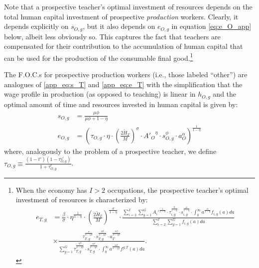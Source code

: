 \documentclass[onehalfspacing,11pt]{article}
\begin{document}
	Note that a prospective teacher's optimal investment of resources depends on the total human capital investment of prospective {\it production} workers. Clearly, it depends explicitly on $s_{O,g}$, but it also depends on $e_{O,g}$ in equation \eqref{eq:e_O_app} below, albeit less obviously so. This captures the fact that teachers are compensated for their contribution to the accumulation of human capital that can be used for the production of the consumable final good.\footnote{When the economy has $I>2$ occupations, the prospective teacher's optimal investment of resources is characterized by:
		\begin{align*}
			e_{T,g} & = \tfrac{\beta}{\sigma}\cdot\eta^{\frac{1}{1-\eta}}\cdot \left(\tfrac{2\widetilde{H}_T}{M}\right)^{\frac{\sigma}{1-\eta}} \cdot \frac{\sum_{i=2}^I \sum_{g=1}^G {A_i'}^\frac{1}{1-\eta}\cdot\tau_{i,g}^\frac{\eta}{1-\eta} \cdot s_{i,g}^\frac{\phi}{1-\eta}\cdot \int_0^\infty a^{\frac{\alpha}{1-\eta}} f_{i,g}(a)da}{\sum_{i=2}^I \sum_{g=1}^G f_{i,g}(a)da} \nonumber\\
			& \times \frac{\tau_{T,g}^\frac{\sigma}{\sigma-\eta\beta } \cdot s_{T,g}^\frac{\phi\beta }{\sigma-\eta\beta } \cdot a_T^\frac{\alpha\beta }{\sigma-\eta\beta }}{\sum_{g=1}^G \tau_{T,g}^\frac{\eta\beta }{\sigma-\eta\beta } \cdot s_{T,g}^\frac{\phi\beta }{\sigma-\eta\beta } \cdot \int_0^\infty a^\frac{\alpha\beta}{\sigma-\eta\beta } f^{g,T}(a)da}.
		\end{align*}
	}
	
	The F.O.C.s for prospective production workers (i.e., those labeled ``other'') are analogues of \eqref{app_eq:s_T} and \eqref{app_eq:e_T} with the simplification that the wage profile in production (as opposed to teaching) is linear in $h_{O,g}$ and the optimal amount of time and resources invested in human capital is given by:
	\begin{align}
		s_{O,g} & = \frac{\mu \phi}{\mu \phi+1-\eta} \\
		\label{eq:e_O_app}
		e_{O,g} & = \left( \tau_{O,g} \cdot \eta \cdot \left(\tfrac{2\widetilde{H}_T}{M}\right)^\sigma\cdot {A'_{O}}^\eta \cdot s_{O,g}^\phi \cdot a_O^\alpha \right)^{\frac{1}{1-\eta}}
	\end{align}
	where, analogously to the problem of a prospective teacher, we define $\tau_{O,g} \equiv \frac{\left( 1-t' \right) \left( 1-\tau^{\omega '}_{O,g} \right)}{1+\tau^e_{O,g}}$.
	
\end{document}

